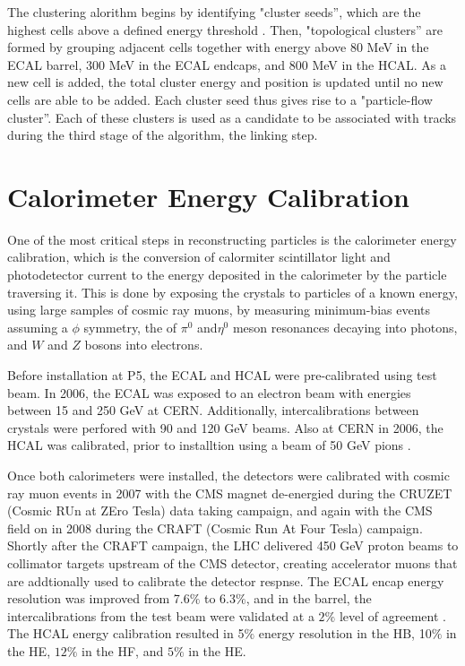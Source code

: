 \par The clustering alorithm begins by identifying "cluster seeds'',
which are the highest \PT cells above a defined energy threshold
\cite{CMS-PAS-PFT-09-001}.  Then, "topological clusters'' are formed
by grouping adjacent cells together with energy above 80 MeV in the
ECAL barrel, 300 MeV in the ECAL endcaps, and 800 MeV in the HCAL.
As a new cell is added, the total cluster energy and position is
updated until no new cells are able to be added.  Each cluster seed
thus gives rise to a "particle-flow cluster''.  Each of these clusters
is used as a candidate to be associated with tracks during the third
stage of the algorithm, the linking step.  


\section{Calorimeter Energy Calibration}
\label{energy_calibration_overview}

\par One of the most critical steps in reconstructing particles is the
calorimeter energy calibration, which is the conversion of calormiter
scintillator light and photodetector current to the energy deposited
in the calorimeter by the particle traversing it.  This is done by
exposing the crystals to particles of a known energy, using large
samples of cosmic ray muons, by measuring minimum-bias events assuming
a $\phi$ symmetry, the of $\pi^{0}$ and$\eta^{0}$ meson resonances
decaying into photons, and $W$ and $Z$ bosons into electrons.   

\par Before installation at P5, the ECAL and HCAL were pre-calibrated
using test beam.  In 2006, the ECAL was exposed to an electron beam with
energies between 15 and 250 GeV \cite{Adzic:2008zza} at CERN.
Additionally, intercalibrations between crystals were perfored with 90
and 120 GeV beams.  Also at CERN in 2006, the HCAL was calibrated,
prior to installtion using a beam of 50 GeV pions
\cite{Cankocak:1127315}. 

\par Once both calorimeters were installed, the detectors were
calibrated with cosmic ray muon events in 2007 with the CMS magnet
de-energied during the CRUZET (Cosmic RUn at ZEro Tesla) data taking
campaign, and again with the CMS field on in 2008 during the CRAFT
(Cosmic Run At Four Tesla) campaign.  Shortly after the CRAFT
campaign, the LHC delivered 450 GeV proton beams to collimator targets
upstream of the CMS detector, creating accelerator muons that are
addtionally used to calibrate the detector respnse.  The ECAL encap
energy resolution was improved from 7.6$\%$ to 6.3$\%$, and in the
barrel, the intercalibrations from the test beam were validated at a
$2\%$ level of agreement \cite{Malberti:1358839}.  The HCAL energy
calibration resulted in 5$\%$ energy resolution in the HB, 10$\%$ in
the HE, $12\%$ in the HF, and $5\%$ in the
HE\cite{Chatrchyan:1223950}.  

